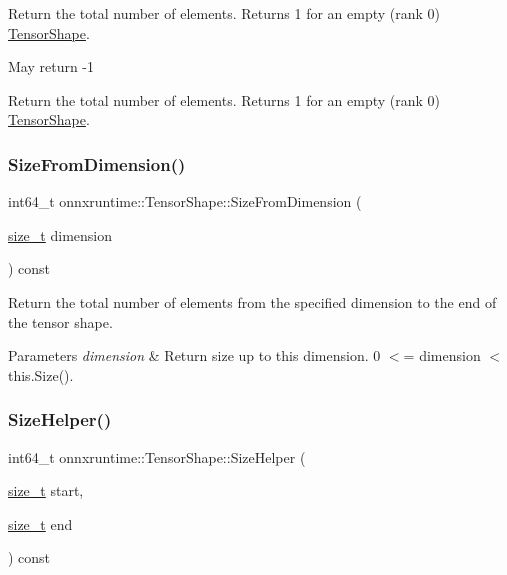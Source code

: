 Return the total number of elements. Returns 1 for an empty (rank 0) \mbox{\hyperlink{classonnxruntime_1_1TensorShape}{Tensor\+Shape}}.

May return -\/1

Return the total number of elements. Returns 1 for an empty (rank 0) \mbox{\hyperlink{classonnxruntime_1_1TensorShape}{Tensor\+Shape}}. \mbox{\label{classonnxruntime_1_1TensorShape_a4a084e4fe8348af11cf8cf1d22c4800d}} 
\subsubsection{\texorpdfstring{Size\+From\+Dimension()}{SizeFromDimension()}}
{\footnotesize\ttfamily int64\+\_\+t onnxruntime\+::\+Tensor\+Shape\+::\+Size\+From\+Dimension (\begin{DoxyParamCaption}\item[{\mbox{\hyperlink{mlasi_8h_a503efbc1c6e50825320ad909366b78ab}{size\+\_\+t}}}]{dimension }\end{DoxyParamCaption}) const}

Return the total number of elements from the specified dimension to the end of the tensor shape. 
\begin{DoxyParams}{Parameters}
{\em dimension} & Return size up to this dimension. 0 $<$= dimension $<$ this.\+Size(). \\
\hline
\end{DoxyParams}
\mbox{\label{classonnxruntime_1_1TensorShape_a85c717aa5d4607765c55a461a5b6f754}} 
\subsubsection{\texorpdfstring{Size\+Helper()}{SizeHelper()}}
{\footnotesize\ttfamily int64\+\_\+t onnxruntime\+::\+Tensor\+Shape\+::\+Size\+Helper (\begin{DoxyParamCaption}\item[{\mbox{\hyperlink{mlasi_8h_a503efbc1c6e50825320ad909366b78ab}{size\+\_\+t}}}]{start,  }\item[{\mbox{\hyperlink{mlasi_8h_a503efbc1c6e50825320ad909366b78ab}{size\+\_\+t}}}]{end }\end{DoxyParamCaption}) const}

